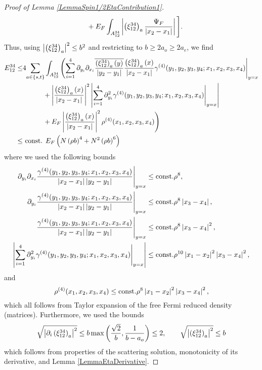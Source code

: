 \begin{proof}[Proof of Lemma \ref{LemmaSpin1/2EtaContribution1}]
\begin{equation}
\begin{aligned}
&\qquad + E_F\int_{A_{12}^{34}} \left\lvert \left(\xi_{12}^{34}\right)_a \frac{\Psi_F}{\left\lvert x_2-x_1 \right\rvert} \right\rvert\Bigg].
\end{aligned}
\end{equation}
Thus, using $ \left\lvert \left(\xi_{12}^{34}\right)_a \right\rvert^2\leq b^2 $ and restricting to $ b\geq 2a_o\geq2a_e $, we find \begin{equation}
\begin{aligned}
E_{12}^{34}\leq& 4\!\sum_{a\in\{s,t\}} \int_{A_{12}^{34}}\Bigg(\! \sum_{i=1}^{4}\partial_{y_i}\partial_{x_i}\overline{\frac{\left(\xi_{12}^{34}\right)_a(y)}{\left\lvert y_2-y_1 \right\rvert}}\frac{\left(\xi_{12}^{34}\right)_a(x)}{\left\lvert x_2-x_1 \right\rvert}\gamma^{(4)}(y_1,y_2,y_3,y_4;x_1,x_2,x_3,x_4)\Bigg\rvert_{y=x}\\
&\qquad\quad+\left\lvert \frac{\left(\xi_{12}^{34}\right)_a(x)}{\left\lvert x_2-x_1 \right\rvert} \right\rvert^2\left\lvert \sum_{i=1}^{4}  \partial_{y_i}^2\gamma^{(4)}(y_1,y_2,y_3,y_4;x_1,x_2,x_3,x_4)\Bigg\rvert_{y=x} \right\rvert\\
&\qquad\quad+E_F\left\lvert \frac{\left(\xi_{12}^{34}\right)_a(x)}{\left\lvert x_2-x_1 \right\rvert} \right\rvert^2\rho^{(4)}(x_1,x_2,x_3,x_4)\Bigg)\\
\leq& \text{ const. } E_F\left(N\left(\rho b\right)^4+N^2\left(\rho b\right)^6 \right)
\end{aligned}
\end{equation}
where we used the following bounds \begin{equation}
\begin{aligned}
\partial_{y_i}\partial_{x_i}\frac{\gamma^{(4)}(y_1,y_2,y_3,y_4;x_1,x_2,x_3,x_4)}{\left\lvert x_2-x_1 \right\rvert\left\lvert y_2-y_1 \right\rvert}\Bigg \lvert_{y=x}&\leq \text{const.} \rho^{8},\\
\partial_{y_i}\frac{\gamma^{(4)}(y_1,y_2,y_3,y_4;x_1,x_2,x_3,x_4)}{\left\lvert x_2-x_1 \right\rvert\left\lvert y_2-y_1 \right\rvert}\Bigg \lvert_{y=x}&\leq \text{const.} \rho^{8}\left\lvert x_3-x_4 \right\rvert,\\
\frac{\gamma^{(4)}(y_1,y_2,y_3,y_4;x_1,x_2,x_3,x_4)}{\left\lvert x_2-x_1 \right\rvert\left\lvert y_2-y_1 \right\rvert}\Bigg \lvert_{y=x}&\leq \text{const.} \rho^{8}\left\lvert x_3-x_4 \right\rvert^2,\\
\left\lvert \sum_{i=1}^{4}\partial_{y_i}^2\gamma^{(4)}(y_1,y_2,y_3,y_4;x_1,x_2,x_3,x_4) \Bigg \lvert_{y=x} \right\rvert&\leq \text{const.} \rho^{10} \left\lvert x_1-x_2 \right\rvert^2\left\lvert x_3-x_4 \right\rvert^2,
\end{aligned}
\end{equation}
and \begin{equation}
\rho^{(4)}(x_1,x_2,x_3,x_4)\leq\text{const.} \rho^8 \left\lvert x_1-x_2 \right\rvert^2\left\lvert x_3-x_4 \right\rvert^2,
\end{equation}
which all follows from Taylor expansion of the free Fermi reduced density (matrices). Furthermore, we used the bounds \begin{equation}
\sqrt{\left\lvert \partial_i\left(\xi_{12}^{34}\right)_a \right\rvert^2}\leq b \max\left(\frac{\sqrt{2}}{b},\frac{1}{b-a_o}\right)\leq 2,\qquad \sqrt{\left\lvert \left(\xi_{12}^{34}\right)_a \right\rvert^2}\leq b
\end{equation}
which follows from properties of the scattering solution, monotonicity of its derivative, and Lemma \ref{LemmaEtaDerivative}.
\end{proof}
